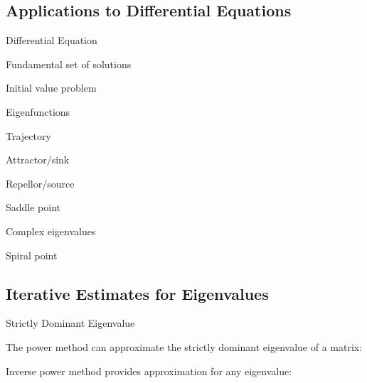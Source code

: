 \begin{card}
    \subsection{Applications to Differential Equations}

    \begin{compactdesc}
    \item[Differential Equation]
    \item[Fundamental set of solutions]
    \item[Initial value problem]
    \item[Eigenfunctions]
    \item[Trajectory]
    \item[Attractor/sink]
    \item[Repellor/source]
    \item[Saddle point]
    \item[Complex eigenvalues]
    \item[Spiral point]
    \end{compactdesc}

\end{card}


\begin{card}
    \subsection{Iterative Estimates for Eigenvalues}

    \begin{compactdesc}
    \item[Strictly Dominant Eigenvalue]
    \item[The power method] can approximate the strictly dominant eigenvalue of
        a matrix:
        \begin{compactenum}
        \item
        \item
        \item
        \end{compactenum}
    \item[Inverse power method] provides approximation for any eigenvalue:
        \begin{compactenum}
        \item
        \item
        \item
        \item
        \end{compactenum}
    \item[]
    \item[]
    \item[]
    \item[]
    \end{compactdesc}

\end{card}


